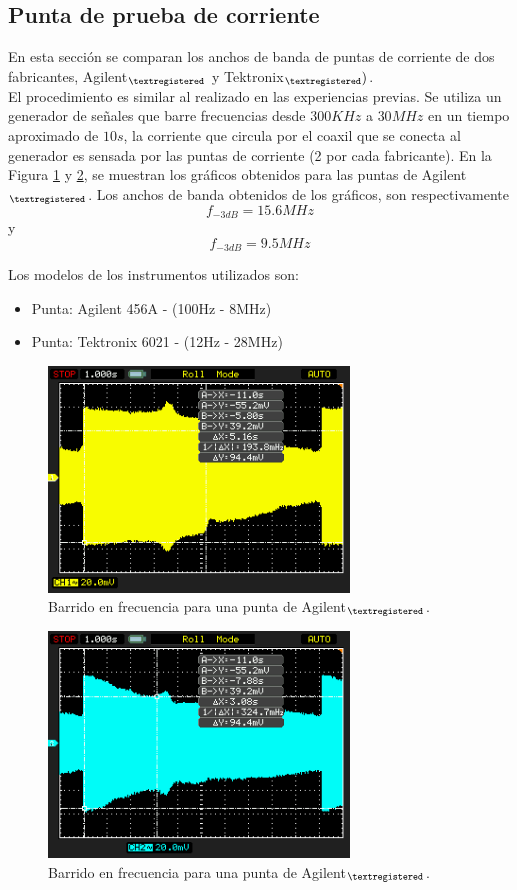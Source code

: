 \documentclass[a4paper,10pt]{article}
\begin{document}
		\subsection{Punta de prueba de corriente}
		\indent En esta secci\'on se comparan los anchos de banda de puntas de
		corriente de dos fabricantes, Agilent$_{\textregistered}$  y 
		Tektronix$_{\textregistered} )$. \\
		\indent El procedimiento es similar al realizado en las experiencias 
		previas. Se utiliza un generador de se\~nales que barre frecuencias 
		desde $300KHz$ a $30MHz$ en un tiempo aproximado de $10s$, la 
		corriente que circula por el coaxil que se conecta al generador es 
		sensada por las puntas de corriente (2 por cada fabricante). En la 
		Figura \ref{img004} y \ref{img005}, se muestran los gr\'aficos 
		obtenidos para las puntas de Agilent$_{\textregistered}$. Los anchos de
		banda obtenidos de los gr\'aficos, son respectivamente 
		$$f_{-3dB}=15.6MHz$$ y $$f_{-3dB}=9.5MHz$$
	
		\indent Los modelos de los instrumentos utilizados son:
		
		\begin{itemize}
			\item Punta: Agilent 456A - (100Hz - 8MHz)
			\item Punta: Tektronix 6021 - (12Hz - 28MHz) 
		\end{itemize}

		\begin{figure}[!htb]
			\centering
			\includegraphics[width=8cm]
			{Imagenes/Mediciones instrumentos/NewFile5.png}
			\caption{Barrido en frecuencia para una punta de 
			Agilent$_{\textregistered}$.} \label{img004}
		\end{figure}
		
		\begin{figure}[!htb]
			\centering
			\includegraphics[width=8cm]
			{Imagenes/Mediciones instrumentos/NewFile6.png}
			\caption{Barrido en frecuencia para una punta de 
			Agilent$_{\textregistered}$.} \label{img005}
		\end{figure}				
		
\end{document}
